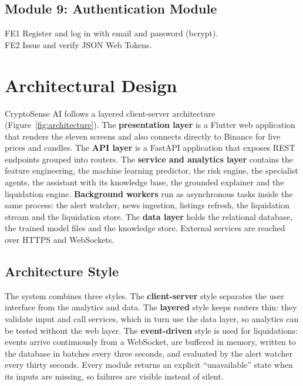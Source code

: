 \subsection*{Module 9: Authentication Module}
FE1 Register and log in with email and password (bcrypt).\\
FE2 Issue and verify JSON Web Tokens.

\section{Architectural Design}
CryptoSense AI follows a layered client-server architecture (Figure~\ref{fig:architecture}). The \textbf{presentation layer} is a Flutter \cite{flutter} web application that renders the eleven screens and also connects directly to Binance for live prices and candles. The \textbf{API layer} is a FastAPI \cite{fastapi} application that exposes REST endpoints grouped into routers. The \textbf{service and analytics layer} contains the feature engineering, the machine learning predictor, the risk engine, the specialist agents, the assistant with its knowledge base, the grounded explainer and the liquidation engine. \textbf{Background workers} run as asynchronous tasks inside the same process: the alert watcher, news ingestion, listings refresh, the liquidation stream and the liquidation store. The \textbf{data layer} holds the relational database, the trained model files and the knowledge store. External services are reached over HTTPS and WebSockets.

\subsection{Architecture Style}
The system combines three styles. The \textbf{client-server} style separates the user interface from the analytics and data. The \textbf{layered} style keeps routers thin: they validate input and call services, which in turn use the data layer, so analytics can be tested without the web layer. The \textbf{event-driven} style is used for liquidations: events arrive continuously from a WebSocket, are buffered in memory, written to the database in batches every three seconds, and evaluated by the alert watcher every thirty seconds. Every module returns an explicit ``unavailable'' state when its inputs are missing, so failures are visible instead of silent.


